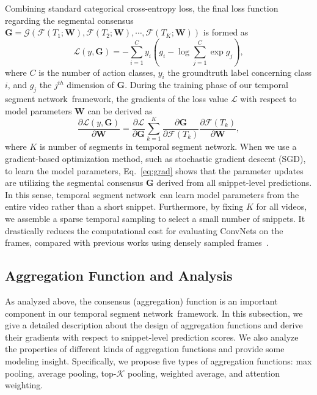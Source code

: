 \documentclass[10pt,journal,compsoc]{IEEEtran}
\newcommand{\SEGNET}{temporal segment network}
\begin{document}
Combining standard categorical cross-entropy loss, the final loss function regarding the segmental consensus $ \mathbf{G} = \mathcal{G}(\mathcal{F}(T_1;\mathbf{W}), \mathcal{F}(T_2;\mathbf{W}), \cdots, \mathcal{F}(T_K; \mathbf{W})) $ is formed as
\begin{equation}
\mathcal{L}(y, \mathbf{G}) = -\sum_{i=1}^{C}y_i \left(g_i - \log\sum_{j=1}^{C}\exp{g_j}\right),
\end{equation}
where $ C $ is the number of action classes, $ y_i $ the groundtruth label concerning class $ i $, and $g_j$ the $j^{th}$ dimension of $\mathbf{G}$. During the training phase of our \SEGNET~framework, the gradients of the loss value $\mathcal{L}$ with respect to model parameters $ \mathbf{W} $  can be derived as
\begin{equation}\label{eq:grad}
\frac{\partial \mathcal{L}(y, \mathbf{G})}{\partial \mathbf{W}} = 
\frac{\partial\mathcal{L}}{\partial \mathbf{G}} \sum_{k=1}^K \frac{\partial \mathbf{G}}{\partial \mathcal{F}(T_k)} \frac{\partial \mathcal{F}(T_k)}{\partial \mathbf{W}},
\end{equation}
where $ K $ is number of segments in \SEGNET. When we use a gradient-based optimization method, such as stochastic gradient descent (SGD), to learn the model parameters, Eq.~\ref{eq:grad} shows that the parameter updates are utilizing the segmental consensus $ \mathbf{G} $ derived from all snippet-level predictions.
In this sense, \SEGNET~can learn model parameters from the entire video rather than a short snippet. 
Furthermore, by fixing $ K $ for all videos, we assemble a sparse temporal sampling to select a small number of snippets.
It drastically reduces the computational cost for evaluating ConvNets on the frames, compared with previous works using densely sampled frames~\cite{Ng15,varol,DonahueJ2015}.

\subsection{Aggregation Function and Analysis}


As analyzed above, the consensus (aggregation) function is an important component in our \SEGNET~framework. In this subsection, we give a detailed description about the design of aggregation functions and derive their gradients with respect to snippet-level prediction scores. We also analyze the properties of different kinds of aggregation functions and provide some modeling insight. Specifically, we propose five types of aggregation functions: max pooling, average pooling, top-$\mathcal{K}$ pooling,  weighted average, and attention weighting.
\end{document}
